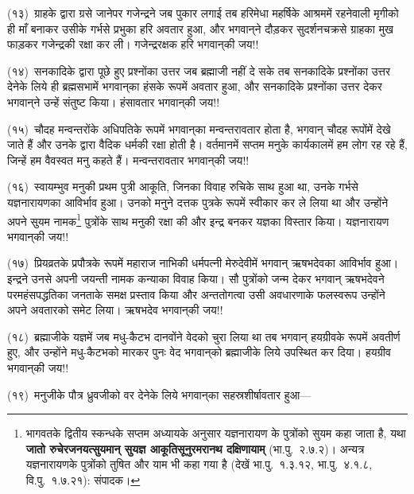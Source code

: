 \begin{sloppypar}\justifying{}
(१३)~ग्राहके द्वारा ग्रसे जानेपर गजेन्द्रने जब पुकार लगाई तब हरिमेधा महर्षिके आश्रममें रहनेवाली मृगीको ही माँ बनाकर उसीके गर्भसे प्रभुका हरि अवतार हुआ, और भगवान्‌ने दौड़कर सुदर्शनचक्रसे ग्राहका मुख फाड़कर गजेन्द्रकी रक्षा कर ली। गजेन्द्ररक्षक हरि भगवान्‌की जय!!
\end{sloppypar}
\begin{sloppypar}\justifying{}
(१४)~सनकादिके द्वारा पूछे हुए प्रश्नोंका उत्तर जब ब्रह्माजी नहीं दे सके तब सनकादिके प्रश्नोंका उत्तर देनेके लिये ही ब्रह्मसभामें भगवान्‌का हंसके रूपमें अवतार हुआ, और सनकादिके प्रश्नोंका उत्तर देकर भगवान्‌ने उन्हें संतुष्ट किया। हंसावतार भगवान्‌की जय!!
\end{sloppypar}
\begin{sloppypar}\justifying{}
(१५)~चौदह मन्वन्तरोंके अधिपतिके रूपमें भगवान्‌का मन्वन्तरावतार होता है, भगवान् चौदह रूपोंमें देखे जाते हैं और उनके द्वारा वैदिक धर्मकी रक्षा होती है। वर्तमानमें सप्तम मनुके कार्यकालमें हम लोग रह रहे हैं, जिन्हें हम वैवस्वत मनु कहते हैं। मन्वन्तरावतार भगवान्‌की जय!!
\end{sloppypar}
\begin{sloppypar}\justifying{}
(१६)~स्वायम्भुव मनुकी प्रथम पुत्री आकूति, जिनका विवाह रुचिके साथ हुआ था, उनके गर्भसे यज्ञनारायणका आविर्भाव हुआ। उनको मनुने दत्तक पुत्रके रूपमें स्वीकार कर ले लिया था और उन्होंने अपने सुयम नामक\footnote{भागवतके द्वितीय स्कन्धके सप्तम अध्यायके अनुसार यज्ञनारायण के पुत्रोंको सुयम कहा जाता है, यथा \textbf{जातो रुचेरजनयत्सुयमान् सुयज्ञ आकूतिसूनुरमरानथ दक्षिणायाम्} (भा.पु.~२.७.२)। अन्यत्र यज्ञनारायणके पुत्रोंको तुषित और याम भी कहा गया है (देखें भा.पु.~१.३.१२, भा.पु.~४.१.८, वि.पु.~१.७.२१): संपादक।} पुत्रोंके साथ मनुकी रक्षा की और इन्द्र बनकर यज्ञका विस्तार किया। यज्ञनारायण भगवान्‌की जय!!
\end{sloppypar}
\begin{sloppypar}\justifying{}
(१७)~प्रियव्रतके प्रपौत्रके रूपमें महाराज नाभिकी धर्मपत्नी मेरुदेवीमें भगवान् ऋषभदेवका आविर्भाव हुआ। इन्द्रने उनसे अपनी जयन्ती नामक कन्याका विवाह किया। सौ पुत्रोंको जन्म देकर भगवान् ऋषभदेवने परमहंस\-पद्धतिका जनताके समक्ष प्रस्ताव किया और अन्ततोगत्वा उसी अवधारणाके फलस्वरूप उन्होंने अपने अवतारको समेट लिया। ऋषभदेव भगवान्‌की जय!!
\end{sloppypar}
\begin{sloppypar}\justifying{}
(१८)~ब्रह्माजीके यज्ञमें जब मधु-कैटभ दानवोंने वेदको चुरा लिया था तब भगवान् हयग्रीवके रूपमें अवतीर्ण हुए, और उन्होंने मधु-कैटभको मारकर पुनः वेद भगवान्‌को ब्रह्माजीके लिये उपस्थित कर दिया। हयग्रीव भगवान्‌की जय!!
\end{sloppypar}
\begin{sloppypar}\justifying{}
(१९)~मनुजीके पौत्र ध्रुवजीको वर देनेके लिये भगवान्‌का सहस्रशीर्षावतार हुआ—
\end{sloppypar}

